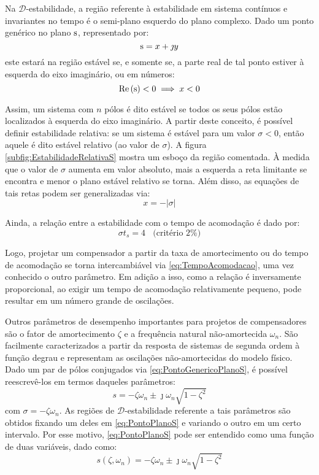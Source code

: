 Na $\mathscr{D}$-estabilidade, a região referente à estabilidade em sistema contínuos e invariantes no tempo é o semi-plano esquerdo do plano complexo. Dado um ponto genérico no plano $\operatorname{\mathrm{s}}$, representado por:
\begin{equation}
\operatorname{\mathrm{s}} = x + \jmath y\label{eq:PontoGenericoPlanoS}
\end{equation}
este estará na região estável se, e somente se, a parte real de tal ponto estiver à esquerda do eixo imaginário, ou em números:
\begin{equation}
\operatorname{Re}{(\operatorname{\mathrm{s}})} < 0 \implies x < 0 \label{eq:Estabilidade}
\end{equation}

Assim, um sistema com $n$ pólos é dito estável se todos os seus pólos estão localizados à esquerda do eixo imaginário. A partir deste conceito, é possível definir estabilidade relativa: se um sistema é estável para um valor $\sigma < 0$, então aquele é dito estável relativo (ao valor de $\sigma$). A figura \ref{subfig:EstabilidadeRelativaS} mostra um esboço da região comentada. À medida que o valor de $\sigma$ aumenta em valor absoluto, mais a esquerda a reta limitante se encontra e menor o plano estável relativo se torna. Além disso, as equações de tais retas podem ser generalizadas via:
\begin{equation}
x = -|\sigma|\label{eq:Sigma}
\end{equation}

Ainda, a relação entre a estabilidade com o tempo de acomodação é dado por:
\begin{equation}
	\sigma t_s = 4 \,\,\,\,\ \text{(critério 2\%)}\label{eq:TempoAcomodacao}
\end{equation}

Logo, projetar um compensador a partir da taxa de amortecimento ou do tempo de acomodação se torna intercambiável via \eqref{eq:TempoAcomodacao}, uma vez conhecido o outro parâmetro. Em adição a isso, como a relação é inversamente proporcional, ao exigir um tempo de acomodação relativamente pequeno, pode resultar em um número grande de oscilações.

Outros parâmetros de desempenho importantes para projetos de compensadores são o fator de amortecimento $\zeta$ e a frequência natural não-amortecida $\omega_n$. São facilmente caracterizados a partir da resposta de sistemas de segunda ordem à função degrau\cite{NISE2011,OGATA2011} e representam as oscilações não-amortecidas do modelo físico. Dado um par de pólos conjugados via \eqref{eq:PontoGenericoPlanoS}, é possível reescrevê-los em termos daqueles parâmetros:
\begin{equation}
s = -\zeta\omega_n \pm \jmath\omega_n \sqrt {1-\zeta^2} \label{eq:PontoPlanoS}
\end{equation}
com $\sigma = -\zeta\omega_n$. As regiões de $\mathscr{D}$-estabilidade referente a tais parâmetros são obtidos fixando um deles em \eqref{eq:PontoPlanoS} e variando o outro em um certo intervalo. Por esse motivo, \eqref{eq:PontoPlanoS} pode ser entendido como uma função de duas variáveis, dado como:
\begin{equation}
s(\zeta,\omega_n) = -\zeta\omega_n \pm \jmath\omega_n \sqrt {1-\zeta^2} \label{eq:FuncaoPontoPlanoS}
\end{equation}

